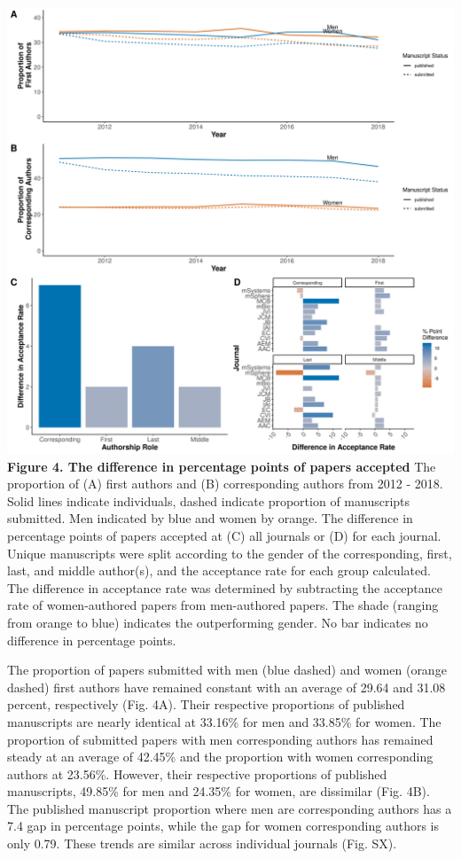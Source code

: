 \documentclass[11pt,]{article}
\begin{document}
\includegraphics{Figure_4.png} \textbf{Figure 4. The difference in
percentage points of papers accepted} The proportion of (A) first
authors and (B) corresponding authors from 2012 - 2018. Solid lines
indicate individuals, dashed indicate proportion of manuscripts
submitted. Men indicated by blue and women by orange. The difference in
percentage points of papers accepted at (C) all journals or (D) for each
journal. Unique manuscripts were split according to the gender of the
corresponding, first, last, and middle author(s), and the acceptance
rate for each group calculated. The difference in acceptance rate was
determined by subtracting the acceptance rate of women-authored papers
from men-authored papers. The shade (ranging from orange to blue)
indicates the outperforming gender. No bar indicates no difference in
percentage points.

The proportion of papers submitted with men (blue dashed) and women
(orange dashed) first authors have remained constant with an average of
29.64 and 31.08 percent, respectively (Fig. 4A). Their respective
proportions of published manuscripts are nearly identical at 33.16\% for
men and 33.85\% for women. The proportion of submitted papers with men
corresponding authors has remained steady at an average of 42.45\% and
the proportion with women corresponding authors at 23.56\%. However,
their respective proportions of published manuscripts, 49.85\% for men
and 24.35\% for women, are dissimilar (Fig. 4B). The published
manuscript proportion where men are corresponding authors has a 7.4 gap
in percentage points, while the gap for women corresponding authors is
only 0.79. These trends are similar across individual journals (Fig.
SX).
\end{document}
